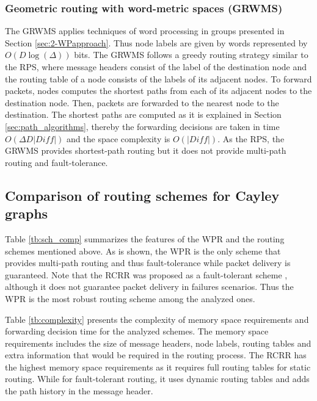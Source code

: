 \subsubsection{Geometric routing with word-metric spaces (GRWMS)}

The GRWMS applies techniques of word processing in groups presented in Section \ref{sec:2-WPapproach}. Thus node labels are given by words represented by $O(D\log(\Delta))$ bits. The GRWMS follows a greedy routing strategy similar to the RPS, where message headers consist of the label of the destination node and the routing table of a node consists of the labels of its adjacent nodes. To forward packets, nodes computes the shortest paths from each of its adjacent nodes to the destination node. Then, packets are forwarded to the nearest node to the destination. The shortest paths are computed as it is explained in Section \ref{sec:path_algorithms}, thereby the forwarding decisions are taken in time $O(\Delta D|Diff|)$ and the space complexity is $O(|Diff|)$.  As the RPS, the GRWMS provides shortest-path routing but it does not provide multi-path routing and fault-tolerance.

\subsection{Comparison of routing schemes for Cayley graphs}



Table \ref{tb:sch_comp} summarizes the features of the WPR and the routing schemes mentioned above. As is shown, the WPR is the only scheme that provides multi-path routing and thus fault-tolerance while packet delivery is guaranteed. Note that the RCRR was proposed as a fault-tolerant scheme \cite{Tang_ft}, although it does not guarantee packet delivery in failures scenarios.
Thus the WPR is the most robust routing scheme among the analyzed ones.



Table \ref{tb:complexity} presents the complexity of memory space requirements and forwarding decision time for the analyzed schemes. The memory space requirements includes the size of message headers, node labels, routing tables and extra information that would be required in the routing process. 
The RCRR has the highest memory space requirements as it requires full routing tables for static routing. While for fault-tolerant routing, it uses dynamic routing tables and adds the path history in the message header. 


